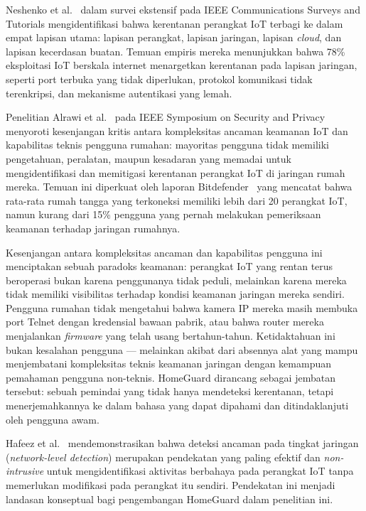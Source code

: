 \documentclass[conference]{IEEEtran}
\begin{document}
Neshenko et al.\ \cite{neshenko2019} dalam survei ekstensif pada
IEEE Communications Surveys and Tutorials mengidentifikasi bahwa
kerentanan perangkat IoT terbagi ke dalam empat lapisan utama: lapisan
perangkat, lapisan jaringan, lapisan \textit{cloud}, dan lapisan kecerdasan
buatan. Temuan empiris mereka menunjukkan bahwa 78\% eksploitasi IoT
berskala internet menargetkan kerentanan pada lapisan jaringan, seperti
port terbuka yang tidak diperlukan, protokol komunikasi tidak terenkripsi,
dan mekanisme autentikasi yang lemah.

Penelitian Alrawi et al.\ \cite{alrawi2019} pada IEEE Symposium on
Security and Privacy menyoroti kesenjangan kritis antara kompleksitas
ancaman keamanan IoT dan kapabilitas teknis pengguna rumahan: mayoritas
pengguna tidak memiliki pengetahuan, peralatan, maupun kesadaran yang
memadai untuk mengidentifikasi dan memitigasi kerentanan perangkat IoT
di jaringan rumah mereka. Temuan ini diperkuat oleh laporan
Bitdefender~\cite{bitdefender2024} yang mencatat bahwa rata-rata rumah
tangga yang terkoneksi memiliki lebih dari 20 perangkat IoT, namun
kurang dari 15\% pengguna yang pernah melakukan pemeriksaan keamanan
terhadap jaringan rumahnya.

Kesenjangan antara kompleksitas ancaman dan kapabilitas pengguna ini
menciptakan sebuah paradoks keamanan: perangkat IoT yang rentan terus
beroperasi bukan karena penggunanya tidak peduli, melainkan karena
mereka tidak memiliki visibilitas terhadap kondisi keamanan jaringan
mereka sendiri. Pengguna rumahan tidak mengetahui bahwa kamera IP
mereka masih membuka port Telnet dengan kredensial bawaan pabrik,
atau bahwa router mereka menjalankan \textit{firmware} yang telah usang
bertahun-tahun. Ketidaktahuan ini bukan kesalahan pengguna ---
melainkan akibat dari absennya alat yang mampu menjembatani
kompleksitas teknis keamanan jaringan dengan kemampuan pemahaman
pengguna non-teknis. HomeGuard dirancang sebagai jembatan tersebut:
sebuah pemindai yang tidak hanya mendeteksi kerentanan, tetapi
menerjemahkannya ke dalam bahasa yang dapat dipahami dan
ditindaklanjuti oleh pengguna awam.

Hafeez et al.\ \cite{hafeez2020} mendemonstrasikan bahwa deteksi
ancaman pada tingkat jaringan (\textit{network-level detection}) merupakan
pendekatan yang paling efektif dan \textit{non-intrusive} untuk
mengidentifikasi aktivitas berbahaya pada perangkat IoT tanpa memerlukan
modifikasi pada perangkat itu sendiri. Pendekatan ini menjadi landasan
konseptual bagi pengembangan HomeGuard dalam penelitian ini.
\end{document}
